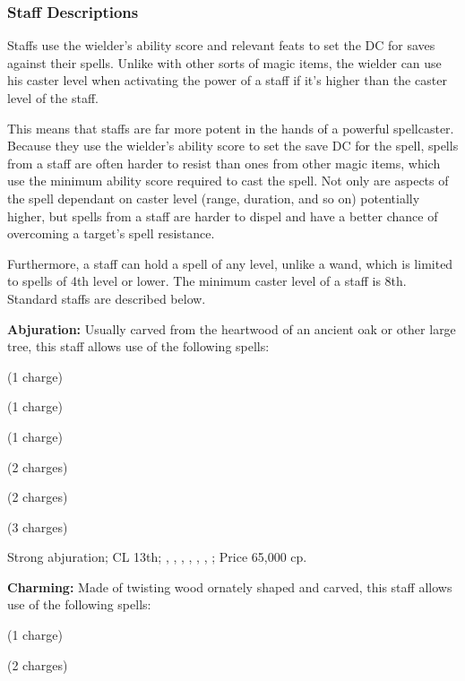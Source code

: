 \subsubsection{Staff Descriptions}
Staffs use the wielder's ability score and relevant feats to set the DC for saves against their spells. Unlike with other sorts of magic items, the wielder can use his caster level when activating the power of a staff if it's higher than the caster level of the staff.

This means that staffs are far more potent in the hands of a powerful spellcaster. Because they use the wielder's ability score to set the save DC for the spell, spells from a staff are often harder to resist than ones from other magic items, which use the minimum ability score required to cast the spell. Not only are aspects of the spell dependant on caster level (range, duration, and so on) potentially higher, but spells from a staff are harder to dispel and have a better chance of overcoming a target's spell resistance.

Furthermore, a staff can hold a spell of any level, unlike a wand, which is limited to spells of 4th level or lower. The minimum caster level of a staff is 8th. Standard staffs are described below.

\textbf{Abjuration:} Usually carved from the heartwood of an ancient oak or other large tree, this staff allows use of the following spells:
\begin{itemize*}
\item {} (1 charge)
\item {} (1 charge)
\item {} (1 charge)
\item {} (2 charges)
\item {} (2 charges)
\item {} (3 charges)
\end{itemize*}

Strong abjuration; CL 13th; , , , , , , ; Price 65,000 cp.

\textbf{Charming:} Made of twisting wood ornately shaped and carved, this staff allows use of the following spells:
\begin{itemize*}
\item {} (1 charge)
\item {} (2 charges)
\end{itemize*}

